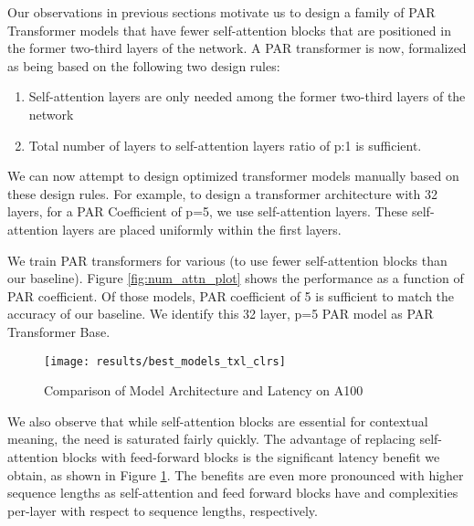 \documentclass[11pt]{article}
\begin{document}
Our observations in previous sections motivate us to design a family of PAR Transformer models that have fewer self-attention blocks that are positioned in the former two-third layers of the network. A PAR transformer is now, formalized as being based on the following two design rules: 

\begin{enumerate}
    \item Self-attention layers are only needed among the former two-third layers of the network
    \item Total number of layers to self-attention layers ratio of p:1 is sufficient.
\end{enumerate}

We can now attempt to design optimized transformer models manually based on these design rules. For example, to design a transformer architecture with 32 layers, for a PAR Coefficient of p=5, we use  self-attention layers. These self-attention layers are placed uniformly within the first  layers. 

We train PAR transformers for various  (to use fewer self-attention blocks than our baseline). Figure \ref{fig:num_attn_plot} shows the performance as a function of PAR coefficient. Of those models, PAR coefficient of 5 is sufficient to match the accuracy of our baseline. We identify this 32 layer, p=5 PAR model as PAR Transformer Base.


\begin{figure}
\centering
\texttt{[image: results/best\_models\_txl\_clrs]}
\caption{Comparison of Model Architecture and Latency on A100}
\label{fig:model_lat}
\end{figure}

We also observe that while self-attention blocks are essential for contextual meaning, the need is saturated fairly quickly. The advantage of replacing self-attention blocks with feed-forward blocks is the significant latency benefit we obtain, as shown in Figure \ref{fig:model_lat}. The benefits are even more pronounced with higher sequence lengths as self-attention and feed forward blocks have  and  complexities per-layer with respect to sequence lengths, respectively.
\end{document}
